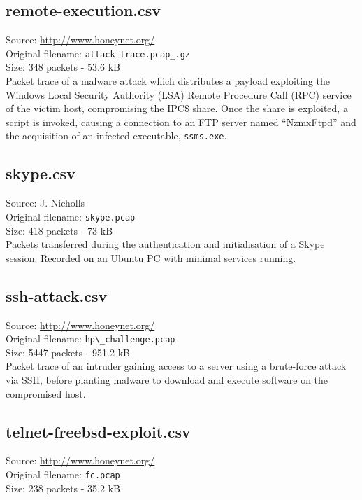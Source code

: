 \documentclass[12pt,a4paper]{article}
\begin{document}
        \subsection{remote-execution.csv}
            Source: \url{http://www.honeynet.org/}\\
            Original filename: \verb!attack-trace.pcap_.gz!\\
            Size: 348 packets - 53.6 kB\\

            Packet trace of a malware attack which distributes a
            payload exploiting the Windows Local Security Authority
            (LSA) Remote Procedure Call (RPC) service of the victim
            host, compromising the IPC\$ share. Once the share is
            exploited, a script is invoked, causing a connection to an
            FTP server named “NzmxFtpd” and the acquisition of an
            infected executable, \verb!ssms.exe!.

        \subsection{skype.csv}
            Source: J. Nicholls\\
            Original filename: \verb|skype.pcap|\\
            Size: 418 packets - 73 kB\\

            Packets transferred during the authentication and
            initialisation of a Skype session. Recorded on an Ubuntu PC
            with minimal services running.

        \subsection{ssh-attack.csv}
            Source: \url{http://www.honeynet.org/}\\
            Original filename: \verb|hp\_challenge.pcap|\\
            Size: 5447 packets - 951.2 kB\\

            Packet trace of an intruder gaining access to a server
            using a brute-force attack via SSH, before planting malware
            to download and execute software on the compromised host.

        \subsection{telnet-freebsd-exploit.csv}
            Source: \url{http://www.honeynet.org/}\\
            Original filename: \verb|fc.pcap|\\
            Size: 238 packets - 35.2 kB\\
\end{document}
